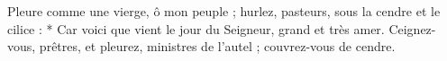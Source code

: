 Pleure comme une vierge, ô mon peuple ; hurlez, pasteurs, sous la cendre et le cilice :
* Car voici que vient le jour du Seigneur, grand et très amer.\versseparator
\versseparator
Ceignez-vous, prêtres, et pleurez, ministres de l'autel ; couvrez-vous de cendre.